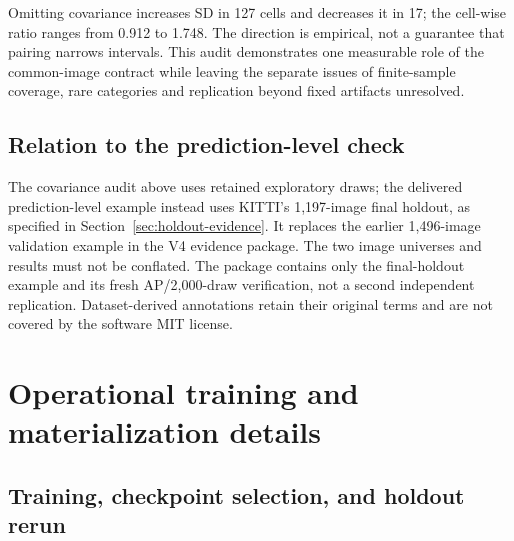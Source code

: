 \documentclass[10pt]{article}
\begin{document}
\begin{table}[htbp]
\centering\small
\caption{Clean--corrupted covariance audit. SDs are in AP points and are medians over cells. SD ratio is the median of cell-wise zero-covariance/paired ratios, not the ratio of the two median SDs. Increased counts cells whose SD increases when covariance is omitted.}
\label{tab:pairing-covariance}

\end{table}

Omitting covariance increases SD in 127 cells and decreases it in 17; the cell-wise ratio ranges from 0.912 to 1.748. The direction is empirical, not a guarantee that pairing narrows intervals. This audit demonstrates one measurable role of the common-image contract while leaving the separate issues of finite-sample coverage, rare categories and replication beyond fixed artifacts unresolved.

\subsection{Relation to the prediction-level check}

The covariance audit above uses retained exploratory draws; the delivered prediction-level example instead uses KITTI's 1,197-image final holdout, as specified in Section~\ref{sec:holdout-evidence}. It replaces the earlier 1,496-image validation example in the V4 evidence package. The two image universes and results must not be conflated. The package contains only the final-holdout example and its fresh AP/2,000-draw verification, not a second independent replication. Dataset-derived annotations retain their original terms and are not covered by the software MIT license.

\FloatBarrier
\section{Operational training and materialization details}

\subsection{Training, checkpoint selection, and holdout rerun}
\end{document}
